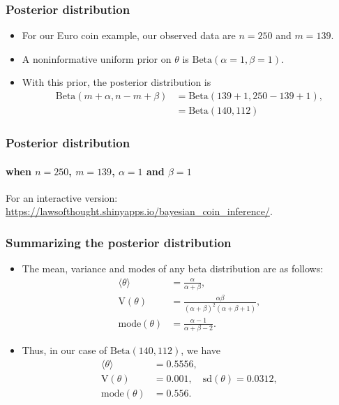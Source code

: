 \documentclass{slides}
\begin{document}
\begin{frame}
	\frametitle{Posterior distribution}
	\begin{itemize}
		\item For our Euro coin example, our observed data are $n=250$ and $m=139$.
		\item A noninformative uniform prior on $\theta$ is $\textrm{Beta}(\alpha=1,\beta=1)$.
		\item With this prior, the posterior distribution is 
			\begin{align*}
				\textrm{Beta}(m + \alpha, n - m + \beta) &= \textrm{Beta}(139 + 1, 250 - 139 + 1),\\
				&= \textrm{Beta}(140, 112)
			\end{align*}
	\end{itemize}
\end{frame}
\begin{frame}
	\frametitle{Posterior distribution}
	\framesubtitle{when $n=250$, $m=139$, $\alpha=1$ and $\beta=1$}
	
	{\small For an interactive version: \url{https://lawsofthought.shinyapps.io/bayesian_coin_inference/}.}
\end{frame}

\begin{frame}
	\frametitle{Summarizing the posterior distribution}
	\begin{itemize}
		\item The mean, variance and modes of any beta distribution are as follows:
			\begin{align*}
				\langle \theta \rangle &=\frac{\alpha}{\alpha+\beta} ,\\
				\mathrm{V}(\theta) &= \frac{\alpha\beta}{(\alpha+\beta)^2(\alpha+\beta+1)},\\
				\textrm{mode}(\theta) &= \frac{\alpha-1}{\alpha+\beta-2}.
			\end{align*}
		\item Thus, in our case of $\textrm{Beta}(140, 112)$, we have
			\begin{align*}
				\langle \theta \rangle &=  0.5556,\\
				\mathrm{V}(\theta) &= 0.001, \quad\textrm{sd}(\theta) = 0.0312,\\
				\textrm{mode}(\theta) &= 0.556.
			\end{align*}

	\end{itemize}
\end{frame}
\end{document}
